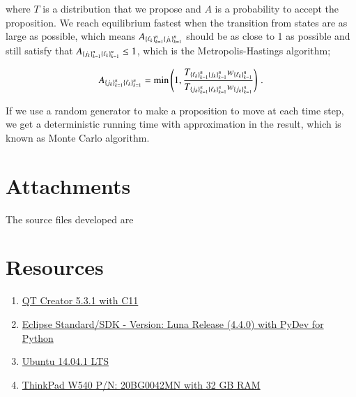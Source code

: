 \documentclass[11pt,english,a4paper]{article}
\begin{document}
\begin{flushleft}
where $T$ is a distribution that we propose and $A$ is a probability to accept the proposition. We reach equilibrium fastest when the transition from states are as large as possible, which means $A_{\left\lbrace{\ell_k}\right\rbrace_{k=1}^n \left\lbrace{j_k}\right\rbrace_{k=1}^n}$ should be as close to 1 as possible and still satisfy that $A_{\left\lbrace{j_k}\right\rbrace_{k=1}^n \left\lbrace{\ell_k}\right\rbrace_{k=1}^n} \leq 1$, which is the Metropolis-Hastings algorithm;

\begin{align}
A_{\left\lbrace{j_k}\right\rbrace_{k=1}^n\left\lbrace{\ell_k}\right\rbrace_{k=1}^n} = \min\left({1,\frac{T_{\left\lbrace{\ell_k}\right\rbrace_{k=1}^n\left\lbrace{j_k}\right\rbrace_{k=1}^n}w_{\left\lbrace{\ell_k}\right\rbrace_{k=1}^n}}{T_{\left\lbrace{j_k}\right\rbrace_{k=1}^n\left\lbrace{\ell_k}\right\rbrace_{k=1}^n}w_{\left\lbrace{j_k}\right\rbrace_{k=1}^n}}}\right)\,.
\label{eq_43}
\end{align} 

If we use a random generator to make a proposition to move at each time step, we get a deterministic running time with approximation in the result, which is known as Monte Carlo algorithm. 

\section{Attachments}

The source files developed are


\section{Resources}

\begin{enumerate}
\item{\href{http://qt-project.org/downloads}{QT Creator 5.3.1 with C11}}
\item{\href{https://www.eclipse.org/downloads/}{Eclipse Standard/SDK  - Version: Luna Release (4.4.0) with PyDev for Python}}
\item{\href{http://www.ubuntu.com/download/desktop}{Ubuntu 14.04.1 LTS}}
\item{\href{http://shop.lenovo.com/no/en/laptops/thinkpad/w-series/w540/#tab-reseller}{ThinkPad W540 P/N: 20BG0042MN with 32 GB RAM}}
\end{enumerate}


\end{flushleft}
\end{document}
